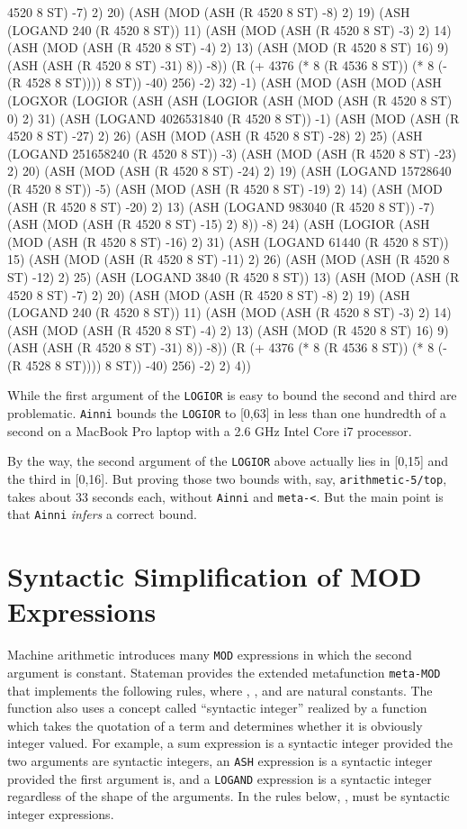 \documentclass[submission,copyright,creativecommons]{eptcs}
\newcommand{\ptt}[1]{\tt{#1}}
\begin{document}
\begin{acl2p}
{{    4520 8 ST) -7) 2) 20) (ASH (MOD (ASH (R 4520 8 ST) -8) 2) 19) (ASH (LOGAND 240 (R 4520 8 ST)) 11) (ASH (MOD (ASH (R 4520 8 ST) -3)
    2) 14) (ASH (MOD (ASH (R 4520 8 ST) -4) 2) 13) (ASH (MOD (R 4520 8 ST) 16) 9) (ASH (ASH (R 4520 8 ST) -31) 8)) -8)) (R (+ 4376 (* 8
    (R 4536 8 ST)) (* 8 (- (R 4528 8 ST)))) 8 ST)) -40) 256) -2) 32) -1)
  (ASH (MOD (ASH (MOD (ASH (LOGXOR (LOGIOR (ASH (ASH (LOGIOR (ASH (MOD (ASH (R 4520 8 ST) 0) 2) 31) (ASH (LOGAND 4026531840 (R 4520
    8 ST)) -1) (ASH (MOD (ASH (R 4520 8 ST) -27) 2) 26) (ASH (MOD (ASH (R 4520 8 ST) -28) 2) 25) (ASH (LOGAND 251658240 (R 4520 8 ST))
    -3) (ASH (MOD (ASH (R 4520 8 ST) -23) 2) 20) (ASH (MOD (ASH (R 4520 8 ST) -24) 2) 19) (ASH (LOGAND 15728640 (R 4520 8 ST)) -5) (ASH
    (MOD (ASH (R 4520 8 ST) -19) 2) 14) (ASH (MOD (ASH (R 4520 8 ST) -20) 2) 13) (ASH (LOGAND 983040 (R 4520 8 ST)) -7) (ASH (MOD (ASH
    (R 4520 8 ST) -15) 2) 8)) -8) 24) (ASH (LOGIOR (ASH (MOD (ASH (R 4520 8 ST) -16) 2) 31) (ASH (LOGAND 61440 (R 4520 8 ST)) 15) (ASH
    (MOD (ASH (R 4520 8 ST) -11) 2) 26) (ASH (MOD (ASH (R 4520 8 ST) -12) 2) 25) (ASH (LOGAND 3840 (R 4520 8 ST)) 13) (ASH (MOD (ASH (R
    4520 8 ST) -7) 2) 20) (ASH (MOD (ASH (R 4520 8 ST) -8) 2) 19) (ASH (LOGAND 240 (R 4520 8 ST)) 11) (ASH (MOD (ASH (R 4520 8 ST) -3)
    2) 14) (ASH (MOD (ASH (R 4520 8 ST) -4) 2) 13) (ASH (MOD (R 4520 8 ST) 16) 9) (ASH (ASH (R 4520 8 ST) -31) 8)) -8)) (R (+ 4376 (* 8
    (R 4536 8 ST)) (* 8 (- (R 4528 8 ST)))) 8 ST)) -40) 256) -2) 2) 4))
}}\end{acl2p}


While the first argument of the {\ptt{LOGIOR}} is easy to bound the second and third are problematic. 
{\ptt{Ainni}} bounds the {\ptt{LOGIOR}} to [0,63] in less than one hundredth
of a second on a MacBook Pro laptop with a 2.6 GHz Intel Core i7 processor.

By the way, the second argument of the {\ptt{LOGIOR}} above actually lies in
[0,15] and the third in [0,16].  But proving those two bounds with, say,
{\ptt{arithmetic-5/top}}, takes about 33 seconds each, without {\ptt{Ainni}}
and {\ptt{meta-<}}.  But the main point is that {\ptt{Ainni}}
{\em{infers}} a correct bound.

\section{Syntactic Simplification of MOD Expressions}
\label{metamod}

Machine arithmetic introduces many {\ptt{MOD}} expressions in which the
second argument is constant.  Stateman provides the extended metafunction
{\ptt{meta-MOD}} that implements the following rules, where , , and  are
natural constants.  The function also uses a concept called ``syntactic
integer'' realized by a function which takes the quotation of a term and
determines whether it is obviously integer valued.  For example, a sum
expression is a syntactic integer provided the two arguments are syntactic
integers, an {\ptt{ASH}} expression is a syntactic integer provided the first
argument is, and a {\ptt{LOGAND}} expression is a syntactic integer
regardless of the shape of the arguments.  In the rules below, , 
must be syntactic integer expressions.
\end{document}
